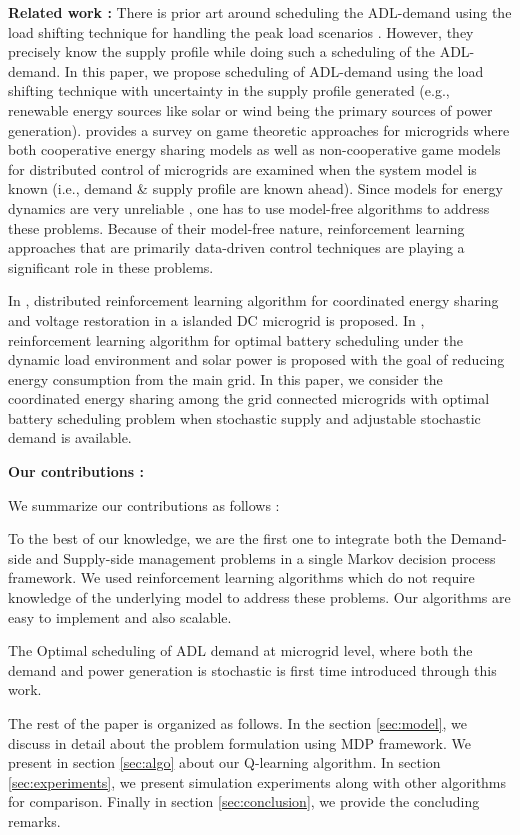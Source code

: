 \textbf{Related work :} There is prior art around scheduling the ADL-demand using the load shifting technique for handling the peak load scenarios \cite{CL2014}. However, they precisely know the supply profile while doing such a scheduling of the ADL-demand. In this paper, we propose scheduling of ADL-demand using the load shifting technique with uncertainty in the supply profile generated (e.g., renewable energy sources like solar or wind being the primary sources of power generation).
 \cite{saad2012game} provides a survey on game theoretic approaches for microgrids where both cooperative energy sharing models as well as non-cooperative game models for distributed control of microgrids are examined when the system model is known (i.e., demand \& supply profile are known ahead). Since  models for energy dynamics are very unreliable \cite{zamora2010controls}, one has to use model-free algorithms to address these problems.  Because of their model-free nature, reinforcement learning \cite{sutton1998reinforcement} approaches that are primarily data-driven control techniques are playing a significant role in these problems.

In \cite{zifadistributed}, distributed reinforcement learning algorithm for coordinated energy sharing and voltage restoration in a islanded DC microgrid is proposed. In \cite{leo2014reinforcement}, reinforcement learning algorithm for optimal battery scheduling under the dynamic load environment and solar power is proposed with the goal of  reducing  energy consumption from the main grid. In this paper, we  consider the coordinated energy sharing among the grid connected microgrids with optimal battery scheduling problem when stochastic supply and adjustable stochastic demand is available.

\textbf{Our contributions :}
\begin{inparaenum}[\bfseries (i)]
We summarize our contributions as follows :\\
\item To the best of our knowledge, we are the first one to integrate both the Demand-side and Supply-side management problems  in a single Markov decision process framework. We used reinforcement learning algorithms which do not require knowledge of the underlying model to address these problems. Our algorithms are easy to implement and also scalable.\\
\item The Optimal scheduling of ADL demand at microgrid level, where both the demand and power generation is stochastic is first time introduced through this work. \\    
\end{inparaenum}

The rest of the paper is organized as follows. In the section \ref{sec:model}, we discuss in detail about the problem formulation using MDP framework. We present  in section \ref{sec:algo} about our Q-learning algorithm. In section \ref{sec:experiments}, we present simulation experiments along with other algorithms for comparison. Finally in section \ref{sec:conclusion}, we provide the concluding remarks.